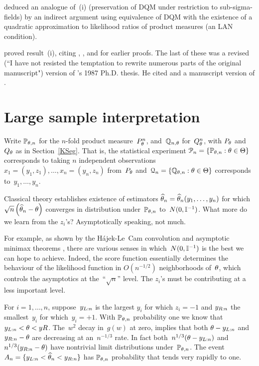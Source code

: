 \documentclass[aos]{imsart}
\begin{document}
\citet[Section~7]{Lecam:Yang:88AS} deduced an  analogue of~(i)  (preservation
of DQM under restriction to sub-sigma-fields) by an indirect argument using
equivalence of DQM with the existence of a quadratic approximation to
likelihood ratios of product measures (an LAN condition). 

\citet[page~461]{BKRW:93book} proved result~(i), citing 
\citet{Ibragimov:Hasminskii:81book},
\citet{Lecam:Yang:88AS}, and 
\citet[Appendix~A3]{vaart:88cwi} for earlier proofs. The last of these was a revised
(``I have not resisted the temptation to rewrite numerous parts of the original manuscript") version of \citeauthor{vaart:88cwi}'s 1987 Ph.D. thesis. He  cited \citet{Lecam:Yang:88AS} and a manuscript version of \citet{BKRW:93book}.




\section{Large sample interpretation}
Write ${\mathbb P}_{\theta,n}$ for the $n$-fold product measure~$P_\theta^n$, and~${\mathbb Q}_{n,\theta}$ for~$Q_\theta^n$, with $P_\theta$ and $Q_\theta$ as in Section~\ref{KSeg}.  That is, the statistical experiment
${\EuScript P}_n=\{{\mathbb P}_{\theta,n}: \theta\in \Theta\}$ corresponds to taking $n$ independent observations~$x_1=(y_1,z_1),\dots, x_n=(y_n,z_n)$ from~$P_\theta$ and~${\EuScript Q}_n=\{{\mathbb Q}_{\theta,n}:\theta\in\Theta\}$ corresponds to~$y_1,\dots,y_n$. 

Classical theory establishes existence of estimators $\widehat \theta_n=\widehat \theta_n(y_1,\dots,y_n)$ for which $\sqrt{n}\left(\widehat \theta_n-\theta\right)$ converges in distribution under~${\mathbb P}_{\theta,n}$ to~$N(0,{\mathbb I}^{-1})$. What more do we learn from the $z_i$'s?  Asymptotically speaking, not much.

For example, as shown by the H\'ajek-Le~Cam convolution and asymptotic minimax theorems \cite[Section~2.3]{BKRW:93book}, there are various senses in which~$N(0,{\mathbb I}^{-1})$ is the best we can hope to achieve. Indeed, the score function essentially determines the  behaviour of the likelihood function in $O(n^{-1/2})$ neighborhoods of~$\theta$, which  controls the asymptotics at the~``$\sqrt{n}$'' level. The $z_i$'s must be contributing at a less important level. 

For $i=1,\dots,n$, suppose~$y_{L:n}$ is the largest $y_i$   for which $z_i = -1$  and $y_{R:n}$ the smallest~$y_i$ for which~$y_i=+1$. With ${\mathbb P}_{\theta,n}$ probability one we know that $y_{L:n}<\theta <yR$. The~$w^2$ decay in~$g(w)$ at zero, implies that both $\theta-y_{L:n}$ and~$y_{R:n}-\theta$ are decreasing at an~$n^{-1/3}$ rate. In fact both~$n^{1/3}(\theta-y_{L:n})$ and $n^{1/3}(y_{R:n}-\theta)$ have nontrivial limit distributions under~${\mathbb P}_{\theta,n}$. The event~$A_n=\{y_{L:n}<\widehat \theta_n<y_{R:n}\}$ has ${\mathbb P}_{\theta,n}$ probability that tends very rapidly to one.
\end{document}
